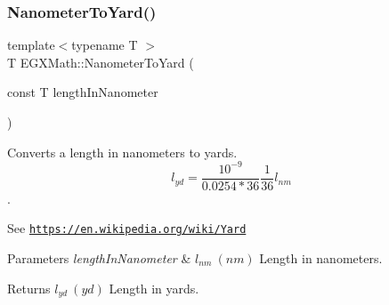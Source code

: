 \subsubsection{\texorpdfstring{Nanometer\+To\+Yard()}{NanometerToYard()}}
{\footnotesize\ttfamily template$<$typename T $>$ \\
T E\+G\+X\+Math\+::\+Nanometer\+To\+Yard (\begin{DoxyParamCaption}\item[{const T}]{length\+In\+Nanometer }\end{DoxyParamCaption})}



Converts a length in nanometers to yards. \[ l_{yd}= \frac{10^{-9}}{0.0254 * 36} \frac{1}{36} l_{nm} \]. 

See \href{https://en.wikipedia.org/wiki/Yard}{\tt https\+://en.\+wikipedia.\+org/wiki/\+Yard} 
\begin{DoxyParams}{Parameters}
{\em length\+In\+Nanometer} & $ l_{nm}\ (nm)$ Length in nanometers. \\
\hline
\end{DoxyParams}
\begin{DoxyReturn}{Returns}
$ l_{yd}\ (yd)$ Length in yards. 
\end{DoxyReturn}

